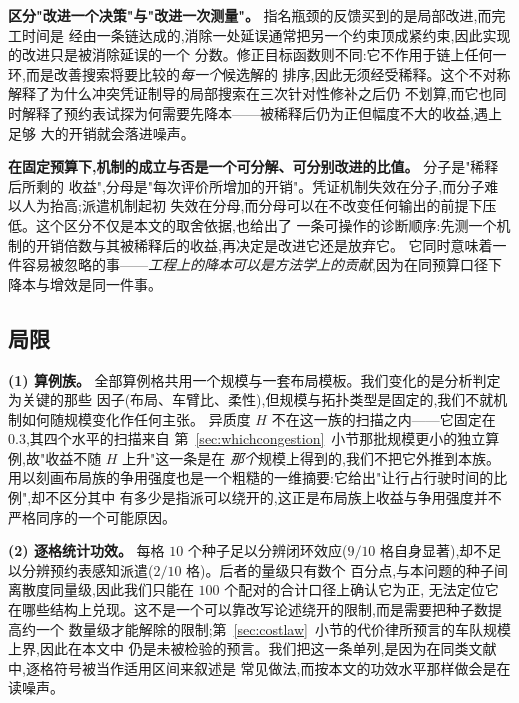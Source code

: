 \documentclass[manuscript,screen,review]{acmart}
\newcommand{\NCases}{10}
\newcommand{\NSeeds}{10}
\newcommand{\NPairs}{100}
\newcommand{\CellsSigLoop}{9}
\newcommand{\CellsSigProbe}{2}
\begin{document}
\textbf{区分"改进一个决策"与"改进一次测量"。} 指名瓶颈的反馈买到的是局部改进,而完工时间是
经由一条链达成的,消除一处延误通常把另一个约束顶成紧约束,因此实现的改进只是被消除延误的一个
分数。修正目标函数则不同:它不作用于链上任何一环,而是改善搜索将要比较的\emph{每一个}候选解的
排序,因此无须经受稀释。这个不对称解释了为什么冲突凭证制导的局部搜索在三次针对性修补之后仍
不划算,而它也同时解释了预约表试探为何需要先降本——被稀释后仍为正但幅度不大的收益,遇上足够
大的开销就会落进噪声。

\textbf{在固定预算下,机制的成立与否是一个可分解、可分别改进的比值。} 分子是"稀释后所剩的
收益",分母是"每次评价所增加的开销"。凭证机制失效在分子,而分子难以人为抬高;派遣机制起初
失效在分母,而分母可以在不改变任何输出的前提下压低。这个区分不仅是本文的取舍依据,也给出了
一条可操作的诊断顺序:先测一个机制的开销倍数与其被稀释后的收益,再决定是改进它还是放弃它。
它同时意味着一件容易被忽略的事——\emph{工程上的降本可以是方法学上的贡献},因为在同预算口径下
降本与增效是同一件事。

\subsection{局限}
\label{sec:limitations}

\textbf{(1) 算例族。} 全部算例格共用一个规模与一套布局模板。我们变化的是分析判定为关键的那些
因子(布局、车臂比、柔性),但规模与拓扑类型是固定的,我们不就机制如何随规模变化作任何主张。
异质度 $H$ 不在这一族的扫描之内——它固定在 $0.3$,其四个水平的扫描来自
第~\ref{sec:whichcongestion}~小节那批规模更小的独立算例,故"收益不随 $H$ 上升"这一条是在
\emph{那个}规模上得到的,我们不把它外推到本族。
用以刻画布局族的争用强度也是一个粗糙的一维摘要:它给出"让行占行驶时间的比例",却不区分其中
有多少是指派可以绕开的,这正是布局族上收益与争用强度并不严格同序的一个可能原因。

\textbf{(2) 逐格统计功效。} 每格 $\NSeeds$ 个种子足以分辨闭环效应($\CellsSigLoop/\NCases$
格自身显著),却不足以分辨预约表感知派遣($\CellsSigProbe/\NCases$ 格)。后者的量级只有数个
百分点,与本问题的种子间离散度同量级,因此我们只能在 $\NPairs$ 个配对的合计口径上确认它为正,
无法定位它在哪些结构上兑现。这不是一个可以靠改写论述绕开的限制,而是需要把种子数提高约一个
数量级才能解除的限制;第~\ref{sec:costlaw}~小节的代价律所预言的车队规模上界,因此在本文中
仍是未被检验的预言。我们把这一条单列,是因为在同类文献中,逐格符号被当作适用区间来叙述是
常见做法,而按本文的功效水平那样做会是在读噪声。
\end{document}
